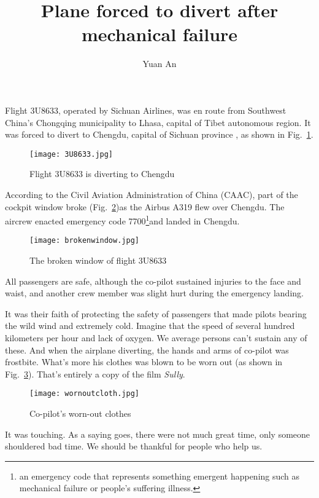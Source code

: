 \documentclass[a4paper,12pt,twocolumn]{article}
\title{Plane forced to divert after mechanical failure}
\author{Yuan An}
\begin{document}
\maketitle
Flight 3U8633, operated by Sichuan Airlines, was en route from Southwest China's Chongqing municipality to Lhasa, capital of Tibet autonomous region. It was forced to divert to Chengdu, capital of Sichuan province \cite{XinhuaNews}, as shown in Fig.~\ref{3U8633}.
\begin{figure}[h]
	\centering
	\texttt{[image: 3U8633.jpg]}
	\caption{Flight 3U8633 is diverting to Chengdu}\label{3U8633}
\end{figure}
\par
According to the Civil Aviation Administration of China (CAAC), part of the cockpit window broke (Fig.~\ref{brokenwindow})as the Airbus A319 flew over Chengdu. The aircrew enacted emergency code 7700\footnote{an emergency code that represents something emergent happening such as mechanical failure or people's suffering illness.}and landed in Chengdu.
\begin{figure}[h]
	\centering
	\texttt{[image: brokenwindow.jpg]}
	\caption{The broken window of flight 3U8633}\label{brokenwindow}
\end{figure}
\par
All passengers are safe, although the co-pilot sustained injuries to the face and waist, and another crew member was slight hurt during the emergency landing.
\par
It was their faith of protecting the safety of passengers that made pilots bearing the wild wind and extremely cold. Imagine that the speed of several hundred kilometers per hour and lack of oxygen. We average persons can't sustain any of these.  And when the airplane diverting, the hands and arms of co-pilot was frostbite. What's more his clothes was blown to be worn out (as shown in Fig.~\ref{clothes}). That's entirely a copy of the film \emph{Sully}.
\begin{figure}[h]
	\centering
	\texttt{[image: wornoutcloth.jpg]}
	\caption{Co-pilot's worn-out clothes}\label{clothes}
\end{figure}
\par
It was touching. As a saying goes, there were not much great time, only someone shouldered bad time. We should be thankful for people who help us.


\end{document}
